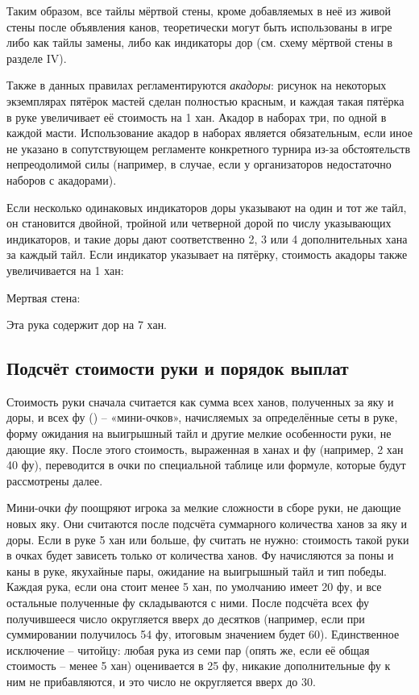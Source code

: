 Таким образом, все тайлы мёртвой стены, кроме добавляемых в неё из живой стены после объявления канов, теоретически могут быть использованы в игре либо как тайлы замены, либо как индикаторы дор (см. схему мёртвой стены в разделе IV).

Также в данных правилах регламентируются \textit{акадоры}: рисунок на некоторых экземплярах пятёрок мастей сделан полностью красным, и каждая такая пятёрка в руке увеличивает её стоимость на 1 хан. Акадор в наборах три, по одной в каждой масти. Использование акадор в наборах является обязательным, если иное не указано в сопутствующем регламенте конкретного турнира из-за обстоятельств непреодолимой силы (например, в случае, если у организаторов недостаточно наборов с акадорами).

Если несколько одинаковых индикаторов доры указывают на один и тот же тайл, он становится двойной, тройной или четверной дорой по числу указывающих индикаторов, и такие доры дают соответственно 2, 3 или 4 дополнительных хана за каждый тайл. Если индикатор указывает на пятёрку, стоимость акадоры также увеличивается на 1 хан:


Мертвая стена:

Эта рука содержит дор на 7 хан.

\subsection{Подсчёт стоимости руки и порядок выплат}

Стоимость руки сначала считается как сумма всех ханов, полученных за яку и доры, и всех фу () – «мини-очков», начисляемых за определённые сеты в руке, форму ожидания на выигрышный тайл и другие мелкие особенности руки, не дающие яку. После этого стоимость, выраженная в ханах и фу (например, 2 хан 40 фу), переводится в очки по специальной таблице или формуле, которые будут рассмотрены далее.

Мини-очки \textit{фу} поощряют игрока за мелкие сложности в сборе руки, не дающие новых яку. Они считаются после подсчёта суммарного количества ханов за яку и доры. Если в руке 5 хан или больше, фу считать не нужно: стоимость такой руки в очках будет зависеть только от количества ханов.
Фу начисляются за поны и каны в руке, якухайные пары, ожидание на выигрышный тайл и тип победы. Каждая рука, если она стоит менее 5 хан, по умолчанию имеет 20 фу, и все остальные полученные фу складываются с ними. После подсчёта всех фу получившееся число округляется вверх до десятков (например, если при суммировании получилось 54 фу, итоговым значением будет 60). Единственное исключение – читойцу: любая рука из семи пар (опять же, если её общая стоимость – менее 5 хан) оценивается в 25 фу, никакие дополнительные фу к ним не прибавляются, и это число не округляется вверх до 30.

